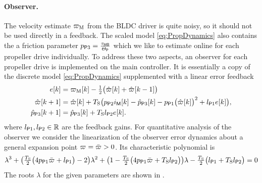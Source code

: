 \paragraph*{Observer.}
The velocity estimate $\PropVelMeas$ from the BLDC driver is quite noisy, so it should not be used directly in a feedback.
The scaled model \eqref{eq:PropDynamics} also contains the a friction parameter $\PropParam[3] = \tfrac{\BLDCFriction}{\PropInertia}$ which we like to estimate online for each propeller drive individually.
To address these two aspects, an observer for each propeller drive is implemented on the main controller.
It is essentially a copy of the discrete model \eqref{eq:PropDynamics} supplemented with a linear error feedback
\begin{subequations}\label{eq:PropObserver}
\begin{align}
 e[k] &= \PropVelMeas[][k] - \tfrac{1}{2} \big( \PropVelObs[][k] + \PropVelObs[][k-1] \big)
\\
 \PropVelObs[][k+1] &= \PropVelObs[][k] + \Ts \big( \PropParam[2] \BLDCCurr[][k] - \PropParamObs[3][k] - \PropParam[1] \big( \PropVelObs[][k]\big)^2 + \PropObsGainVel e[k] \big),
\\
 \PropParamObs[3][k+1] &= \PropParamObs[3][k] + \Ts \PropObsGainBias e[k].
\end{align}
\end{subequations}
where $\PropObsGainVel, \PropObsGainBias \in \RealNum$ are the feedback gains.
For quantitative analysis of the observer we consider the linearization of the observer error dynamics about a general expansion point $\PropVel = \PropVelStat > 0$.
Its characteristic polynomial is
\begin{align}
 \lambda^3 
 + \big( \tfrac{\Ts}{2} \big( 4 \PropParam[1] \PropVelStat + \PropObsGainVel \big) - 2 \big) \lambda^2
 + \big( 1 - \tfrac{\Ts}{2} \big( 4 \PropParam[1] \PropVelStat + \Ts \PropObsGainBias \big) \big) \lambda
 - \tfrac{\Ts}{2} \big( \PropObsGainVel + \Ts \PropObsGainBias \big)
 = 0
\end{align}
The roots $\lambda$ for the given parameters are shown in .


